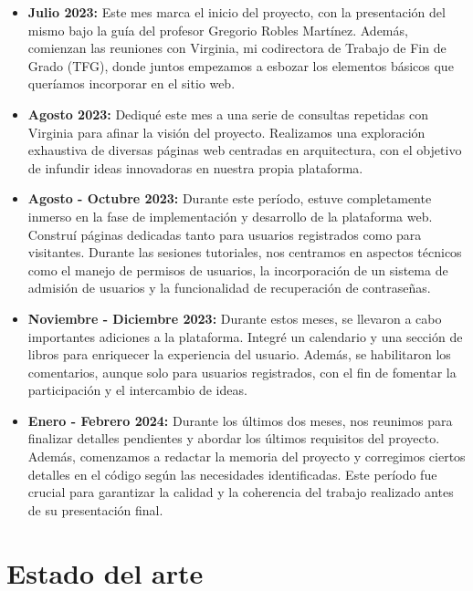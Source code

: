 \documentclass[a4paper, 12pt]{book}
\begin{document}
\begin{itemize}
  \item \textbf{Julio 2023: } Este mes marca el inicio del proyecto, con la presentación del mismo bajo la guía del profesor Gregorio Robles Martínez. Además, comienzan las reuniones con Virginia, mi codirectora de Trabajo de Fin de Grado (TFG), donde juntos empezamos a esbozar los elementos básicos que queríamos incorporar en el sitio web.
  \item \textbf{Agosto 2023: } Dediqué este mes a una serie de consultas repetidas con Virginia para afinar la visión del proyecto. Realizamos una exploración exhaustiva de diversas páginas web centradas en arquitectura, con el objetivo de infundir ideas innovadoras en nuestra propia plataforma.
  \item \textbf{Agosto - Octubre 2023: } Durante este período, estuve completamente inmerso en la fase de implementación y desarrollo de la plataforma web. Construí páginas dedicadas tanto para usuarios registrados como para visitantes. Durante las sesiones tutoriales, nos centramos en aspectos técnicos como el manejo de permisos de usuarios, la incorporación de un sistema de admisión de usuarios y la funcionalidad de recuperación de contraseñas.
  \item \textbf{Noviembre - Diciembre 2023: } Durante estos meses, se llevaron a cabo importantes adiciones a la plataforma. Integré un calendario y una sección de libros para enriquecer la experiencia del usuario. Además, se habilitaron los comentarios, aunque solo para usuarios registrados, con el fin de fomentar la participación y el intercambio de ideas.
  \item \textbf{Enero - Febrero 2024: } Durante los últimos dos meses, nos reunimos para finalizar detalles pendientes y abordar los últimos requisitos del proyecto. Además, comenzamos a redactar la memoria del proyecto y corregimos ciertos detalles en el código según las necesidades identificadas. Este período fue crucial para garantizar la calidad y la coherencia del trabajo realizado antes de su presentación final.
\end{itemize}



\cleardoublepage
\chapter{Estado del arte}
\label{chap:estado}
\end{document}
